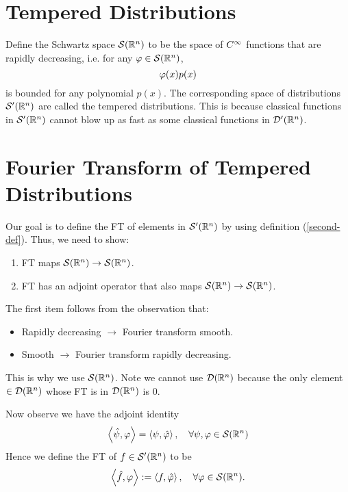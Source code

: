 \section{Tempered Distributions}
Define the Schwartz space ${\mathcal S}({\mathbb R}^n)$ to be the space of $C^\infty$ functions that are rapidly decreasing, i.e. for any $\varphi \in {\mathcal S}({\mathbb R}^n)$,
\[
    \varphi(x)p(x)
\]
is bounded for any polynomial $p(x)$. The corresponding space of distributions ${\mathcal S}'({\mathbb R}^n)$ are called the tempered distributions. This is because classical functions in ${\mathcal S}'({\mathbb R}^n)$ cannot blow up as fast as some classical functions in ${\mathcal D}'({\mathbb R}^n)$.

\section{Fourier Transform of Tempered Distributions}
Our goal is to define the FT of elements in ${\mathcal S}'({\mathbb R}^n)$ by using definition (\ref{second-def}). Thus, we need to show:
\begin{enumerate}
    \item FT maps ${\mathcal S}({\mathbb R}^n) \to {\mathcal S}({\mathbb R}^n)$.
    \item FT has an adjoint operator that also maps ${\mathcal S}({\mathbb R}^n) \to {\mathcal S}({\mathbb R}^n)$.
\end{enumerate}
The first item follows from the observation that:
\begin{itemize}
    \item Rapidly decreasing $\to$ Fourier transform smooth.
    \item Smooth $\to$ Fourier transform rapidly decreasing.
\end{itemize}
This is why we use ${\mathcal S}({\mathbb R}^n)$. Note we cannot use ${\mathcal D}({\mathbb R}^n)$ because the only element $\in {\mathcal D}({\mathbb R}^n)$ whose FT is in ${\mathcal D}({\mathbb R}^n)$ is 0.

Now observe we have the adjoint identity
\[
    \left\langle \hat{\psi}, \varphi \right\rangle =  \left\langle \psi, \hat{\varphi} \right\rangle, \quad \forall \psi, \varphi \in {\mathcal S}({\mathbb R}^n)
\]
Hence we define the FT of $f \in {\mathcal S}'({\mathbb R}^n)$ to be
\[
    \left\langle \hat{f}, \varphi \right\rangle := \left\langle f, \hat{\varphi} \right\rangle, \quad \forall \varphi \in {\mathcal S}({\mathbb R}^n).
\]

